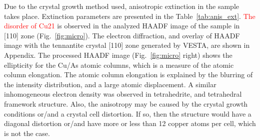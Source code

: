 \documentclass[preprint,review,12pt]{elsarticle}
\begin{document}
\begin{table}
\caption{\label{tab:anis_ext}%
Anisotropic extinction parameters in Cu\textsubscript{12}As\textsubscript{4}S\textsubscript{13}.
}
\centering
{}
\end{table}

Due to the crystal growth method used, anisotropic extinction in the sample takes place. Extinction parameters are presented in the Table~\ref{tab:anis_ext}.
\textcolor{red}{The disorder of Cu21} is observed in the analyzed HAADF image of the sample in [110] zone (Fig.~\ref{fig:micro}).
The electron diffraction, and overlay of HAADF image with the tennantite crystal [110] zone generated by VESTA\cite{Momma2011}, are shown in Appendix.
The processed HAADF image (Fig.~\ref{fig:micro} right) shows  the ellipticity for the Cu/As atomic columns, which is a measure of the atomic column elongation\cite{Nord2017}.
The atomic column elongation is explained by the blurring of the intensity distribution, and a large atomic displacement.
A similar inhomogeneous electron density was observed in tetrahedrite\cite{Mishra2017}, and tetrahedral framework structure\cite{Suekuni2019}.
Also, the anisotropy may be caused by the crystal growth conditions or/and a crystal cell distortion.
If so, then the structure would have a diagonal distortion or/and have more or less than 12 copper atoms per cell, which is not the case.
\end{document}

